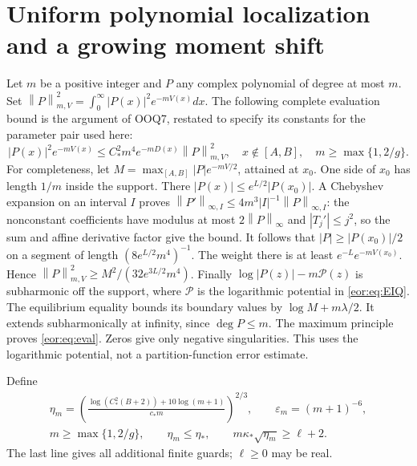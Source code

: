 \documentclass[11pt,a4paper]{article}
\newcommand{\norm}[1]{\left\lVert#1\right\rVert}
\begin{document}
\section{Uniform polynomial localization and a growing moment shift}
\label{eor:sec:localization}
Let $m$ be a positive integer and $P$ any complex polynomial of degree at most $m$.
Set $\norm P_{m,V}^2=\int_0^\infty|P(x)|^2e^{-mV(x)}dx$.
The following complete evaluation bound is the argument of OOQ7, restated to
specify its constants for the parameter pair used here:
\begin{equation}
 |P(x)|^2e^{-mV(x)}\le C_*^2m^4e^{-mD(x)}\norm P_{m,V}^2,
 \quad x\notin[A,B],\quad m\ge\max\{1,2/g\}.
 \label{eor:eq:eval}
\end{equation}
For completeness, let $M=\max_{[A,B]}|P|e^{-mV/2}$, attained at $x_0$.
One side of $x_0$ has length $1/m$ inside the support. There
$|P(x)|\le e^{L/2}|P(x_0)|$.
A Chebyshev expansion on an interval $I$ proves
$\norm{P'}_{\infty,I}\le4m^3|I|^{-1}\norm P_{\infty,I}$:
the nonconstant coefficients have modulus at most $2\norm P_\infty$ and
$|T_j'|\le j^2$, so the sum and affine derivative factor give the bound.
It follows that $|P|\ge|P(x_0)|/2$ on a segment of length
$(8e^{L/2}m^4)^{-1}$. The weight there is at least $e^{-L}e^{-mV(x_0)}$.
Hence $\norm P_{m,V}^2\ge M^2/(32e^{3L/2}m^4)$.
Finally $\log|P(z)|-m\mathcal P(z)$ is subharmonic off the support,
where $\mathcal P$ is the logarithmic potential in \eqref{eor:eq:EIQ}.
The equilibrium equality bounds its boundary values by $\log M+m\lambda/2$.
It extends subharmonically at infinity, since $\deg P\le m$.
The maximum principle proves \eqref{eor:eq:eval}. Zeros give only negative singularities.
This uses the logarithmic potential, not a partition-function error estimate.

Define
\begin{equation}
\begin{gathered}
 \eta_m=\left(
 \frac{\log(C_*^2(B+2))+10\log(m+1)}{c_*m}
 \right)^{2/3},\qquad \varepsilon_m=(m+1)^{-6},\\
 m\ge\max\{1,2/g\},\qquad
 \eta_m\le\eta_*,\qquad
 m\kappa_*\sqrt{\eta_m}\ge\ell+2 .
\end{gathered}\label{eor:eq:guards}
\end{equation}
The last line gives all additional finite guards; $\ell\ge0$ may be real.
\end{document}
